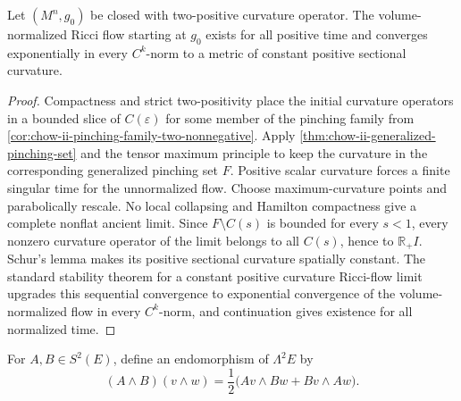 \begin{theorem}
  \label{thm:chow-ii-boehm-wilking-convergence}
  Let \((M^n,g_0)\) be closed with two-positive curvature operator.  The
  volume-normalized Ricci flow starting at \(g_0\) exists for all positive
  time and converges exponentially in every \(C^k\)-norm to a metric of
  constant positive sectional curvature.
\end{theorem}
\begin{proof}
  Compactness and strict two-positivity place the initial curvature operators
  in a bounded slice of \(C(\varepsilon)\) for some member of the pinching
  family from \ref{cor:chow-ii-pinching-family-two-nonnegative}.  Apply
  \ref{thm:chow-ii-generalized-pinching-set} and the tensor maximum principle
  to keep the curvature in the corresponding generalized pinching set \(F\).
  Positive scalar curvature forces a finite singular time for the unnormalized
  flow.  Choose maximum-curvature points and parabolically rescale.  No local
  collapsing and Hamilton compactness give a complete nonflat ancient limit.
  Since \(F\setminus C(s)\) is bounded for every \(s<1\), every nonzero
  curvature operator of the limit belongs to all \(C(s)\), hence to
  \(\mathbb R_+I\).  Schur's lemma makes its positive sectional curvature
  spatially constant.  The standard stability theorem for a constant positive
  curvature Ricci-flow limit upgrades this sequential convergence to
  exponential convergence of the volume-normalized flow in every
  \(C^k\)-norm, and continuation gives existence for all normalized time.
\end{proof}

\begin{definition}
  \label{def:chow-ii-symmetric-endomorphism-wedge}
  For \(A,B\in S^2(E)\), define an endomorphism of \(\Lambda^2E\) by
  \[
    (A\wedge B)(v\wedge w)
      =\frac12\bigl(Av\wedge Bw+Bv\wedge Aw\bigr).
  \]
\end{definition}

